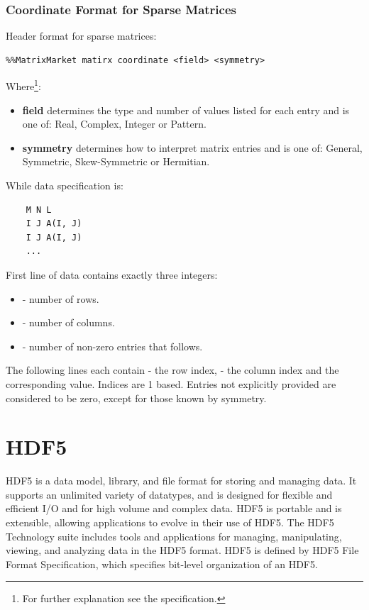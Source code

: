 \documentclass[thesis=M,english]{FITthesis}[2019/12/23]
\begin{document}
\subsubsection{Coordinate Format for Sparse Matrices}

Header format for sparse matrices:
\begin{lstlisting}
%%MatrixMarket matirx coordinate <field> <symmetry>
\end{lstlisting}

Where\footnote{For further explanation see the specification.}:
\begin{itemize}
    \item \textbf{field} determines the type and number of values listed for each entry
          and is one of: Real, Complex, Integer or Pattern.
    \item \textbf{symmetry} determines how to interpret matrix entries
          and is one of: General, Symmetric, Skew-Symmetric or Hermitian.
\end{itemize}

While data specification is:
\begin{lstlisting}
    M N L
    I J A(I, J)
    I J A(I, J)
    ...
\end{lstlisting}

First line of data contains exactly three integers:
\begin{itemize}
    \item {} - number of rows.
    \item {} - number of columns.
    \item {} - number of non-zero entries that follows.
\end{itemize}

The following  lines each contain  - the row index,  - the column index
and the corresponding value. Indices are 1 based. Entries not explicitly provided are considered
to be zero, except for those known by symmetry.


\section{HDF5}

HDF5 is a data model, library, and file format for storing and managing data.
It supports an unlimited variety of datatypes, and is designed for flexible and
efficient I/O and for high volume and complex data. HDF5 is portable and is extensible,
allowing applications to evolve in their use of HDF5. The HDF5 Technology suite includes
tools and applications for managing, manipulating, viewing, and analyzing data in the HDF5 format.
\cite{hdf5} HDF5 is defined by HDF5 File Format Specification, which specifies bit-level organization of an HDF5.
\end{document}
